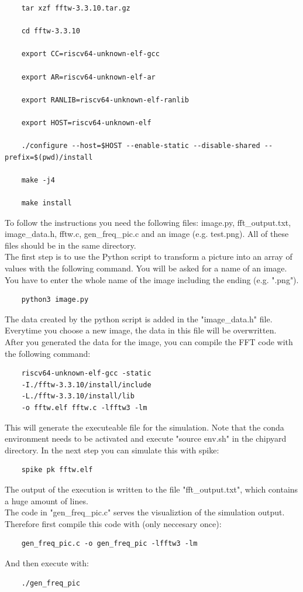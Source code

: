 \documentclass{article}
\begin{document}
{\begin{verbatim}
    tar xzf fftw-3.3.10.tar.gz

    cd fftw-3.3.10

    export CC=riscv64-unknown-elf-gcc

    export AR=riscv64-unknown-elf-ar

    export RANLIB=riscv64-unknown-elf-ranlib

    export HOST=riscv64-unknown-elf

    ./configure --host=$HOST --enable-static --disable-shared --prefix=$(pwd)/install

    make -j4

    make install
\end{verbatim}
To follow the instructions you need the following files:  image.py, fft\_output.txt, image\_data.h, fftw.c, gen\_freq\_pic.c and an image (e.g. test.png). All of these files should be in the
same directory.\\
The first step is to use the Python script to transform a picture into an array of values with 
the following command. You will be asked for a name of an image. You have to enter the whole name of the image including the ending (e.g. ".png").\\
\begin{verbatim}
    python3 image.py
\end{verbatim} 
The data created by the python script is added in the "image\_data.h" file. Everytime you choose a new image, the data in this file will be overwritten.\\
After you generated the data for the image, you can compile the FFT code with the following command:\\
\begin{verbatim}
    riscv64-unknown-elf-gcc -static 
    -I./fftw-3.3.10/install/include 
    -L./fftw-3.3.10/install/lib 
    -o fftw.elf fftw.c -lfftw3 -lm
\end{verbatim}
This will generate the executeable file for the simulation. Note that the conda environment needs to be activated and execute "source env.sh" in the chipyard directory. In the next step you can simulate this with spike:\\
\begin{verbatim}
    spike pk fftw.elf
\end{verbatim}
The output of the execution is written to the file "fft\_output.txt", which contains a huge amount of lines.\\
The code in "gen\_freq\_pic.c" serves the visualiztion of the simulation output. Therefore first compile this code with (only neccesary once):\\
\begin{verbatim}
    gen_freq_pic.c -o gen_freq_pic -lfftw3 -lm
\end{verbatim}
And then execute with:\\
\begin{verbatim}
    ./gen_freq_pic
\end{verbatim}
}
\end{document}
